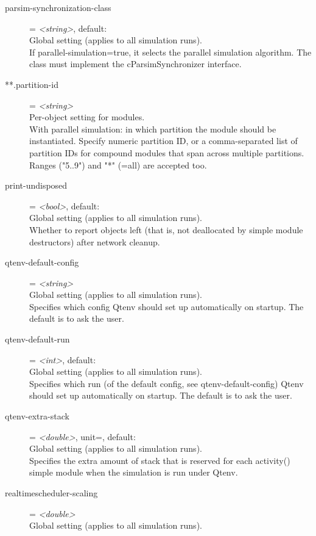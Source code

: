 \begin{description}
\item[parsim-synchronization-class] = \textit{<string>}, default: \\
    Global setting (applies to all simulation runs).\\
    If parallel-simulation=true, it selects the parallel simulation algorithm.
    The class must implement the cParsimSynchronizer interface.
\item[**.partition-id] = \textit{<string>}\\
    Per-object setting for modules.\\
    With parallel simulation: in which partition the module should be
    instantiated. Specify numeric partition ID, or a comma-separated list of
    partition IDs for compound modules that span across multiple partitions.
    Ranges ("5..9") and "*" (=all) are accepted too.
\item[print-undisposed] = \textit{<bool>}, default: \\
    Global setting (applies to all simulation runs).\\
    Whether to report objects left (that is, not deallocated by simple module
    destructors) after network cleanup.
\item[qtenv-default-config] = \textit{<string>}\\
    Global setting (applies to all simulation runs).\\
    Specifies which config Qtenv should set up automatically on startup. The
    default is to ask the user.
\item[qtenv-default-run] = \textit{<int>}, default: \\
    Global setting (applies to all simulation runs).\\
    Specifies which run (of the default config, see qtenv-default-config) Qtenv
    should set up automatically on startup. The default is to ask the user.
\item[qtenv-extra-stack] = \textit{<double>}, unit=, default: \\
    Global setting (applies to all simulation runs).\\
    Specifies the extra amount of stack that is reserved for each activity()
    simple module when the simulation is run under Qtenv.
\item[realtimescheduler-scaling] = \textit{<double>}\\
    Global setting (applies to all simulation runs).\\

\end{description}
